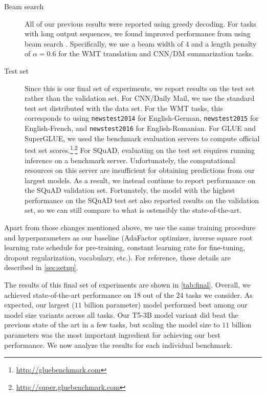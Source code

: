 \begin{description}
\item[Beam search] All of our previous results were reported using greedy decoding. For tasks with long output sequences, we found improved performance from using beam search \citep{sutskever2014sequence}. Specifically, we use a beam width of $4$ and a length penalty of $\alpha = 0.6$ \citep{wu2016google} for the WMT translation and CNN/DM summarization tasks.

\item[Test set] Since this is our final set of experiments, we report results on the test set rather than the validation set. For CNN/Daily Mail, we use the standard test set distributed with the data set. For the WMT tasks, this corresponds to using \texttt{newstest2014} for English-German, \texttt{newstest2015} for English-French, and \texttt{newstest2016} for English-Romanian. For GLUE and SuperGLUE, we used the benchmark evaluation servers to compute official test set scores.\footnote{\url{http://gluebenchmark.com}}\textsuperscript{,}\footnote{\url{http://super.gluebenchmark.com}}
For SQuAD, evaluating on the test set requires running inference on a benchmark server. Unfortunately, the computational resources on this server are insufficient for obtaining predictions from our largest models. As a result, we instead continue to report performance on the SQuAD validation set. Fortunately, the model with the highest performance on the SQuAD test set also reported results on the validation set, so we can still compare to what is ostensibly the state-of-the-art.

\end{description}

Apart from those changes mentioned above, we use the same training procedure and hyperparameters as our baseline (AdaFactor optimizer, inverse square root learning rate schedule for pre-training, constant learning rate for fine-tuning, dropout regularization, vocabulary, etc.). For reference, these details are described in \ref{sec:setup}.

The results of this final set of experiments are shown in \ref{tab:final}.
Overall, we achieved state-of-the-art performance on $18$ out of the $24$ tasks we consider. As expected, our largest ($11$ billion parameter) model performed best among our model size variants across all tasks. Our T5-3B model variant did beat the previous state of the art in a few tasks, but scaling the model size to $11$ billion parameters was the most important ingredient for achieving our best performance. We now analyze the results for each individual benchmark.

